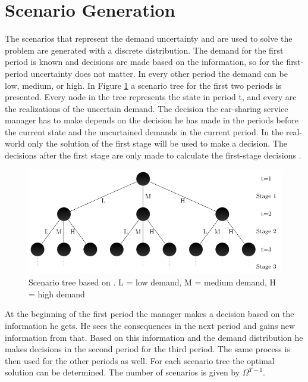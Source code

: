 \section{Scenario Generation}
\label{Scenario}
The scenarios that represent the demand uncertainty and are used to solve the problem are generated with a discrete distribution. The demand for the first period is known and decisions are made based on the information, so for the first-period uncertainty does not matter. In every other period the demand can be low, medium, or high. In Figure \ref{fig:scenarios} a scenario tree for the first two periods is presented.
Every node in the tree represents the state in period t, and every arc the realizations of the uncertain demand. The decision the car-sharing service manager has to make depends on the decision he has made in the periods before the current state and the uncurtained demands in the current period. In the real-world only the solution of the first stage will be used to make a decision. The decisions after the first stage are only made to calculate the first-stage decisions \cite{FLETEN200237}.
\begin{figure}[H]
\includegraphics{Figures/figure.pdf}
\caption{Scenario tree based on \cite{Wei_1}. L = low demand, M = medium demand, H = high demand }
\centering
\label{fig:scenarios}
\end{figure}
At the beginning of the first period the manager makes a decision based on the information he gets. He sees the consequences in the next period and gains new information from that. Based on this information and the demand distribution he makes decisions in the second period for the third period. The same process is then used for the other periods as well. For each scenario tree the optimal solution can be determined. The number of scenarios is given by $\Omega^{T-1}$.
